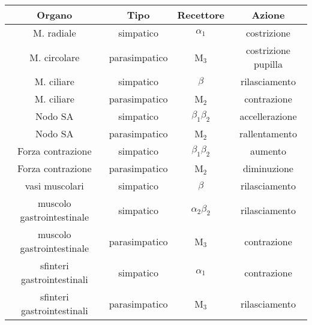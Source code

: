 
\begin{tabular}{|c|c|c|c|}
\hline 
\textbf{Organo} & \textbf{Tipo} & \textbf{Recettore} & \textbf{Azione} \\ 
\hline\hline 
M. radiale & simpatico & $\alpha_1$ & costrizione \\ 
\hline 
M. circolare & parasimpatico & M${}_3$ & costrizione pupilla \\ 
\hline 
M. ciliare & simpatico & $\beta$ & rilasciamento \\ 
\hline 
M. ciliare & parasimpatico & M${}_2$ & contrazione \\ 
\hline 
Nodo SA & simpatico & $\beta_1\beta_2$ & accellerazione \\ 
\hline 
Nodo SA & parasimpatico & M${}_2$ & rallentamento \\ 
\hline 
Forza contrazione & simpatico & $\beta_1\beta_2$ & aumento \\ 
\hline 
Forza contrazione & parasimpatico & M${}_2$ & diminuzione \\ 
\hline 
vasi muscolari & simpatico & $\beta$ & rilasciamento \\ 
\hline 
muscolo gastrointestinale & simpatico & $\alpha_2\beta_2$ & rilasciamento \\ 
\hline 
muscolo gastrointestinale & parasimpatico & M${}_3$ & contrazione \\ 
\hline 
sfinteri gastrointestinali & simpatico & $\alpha_1$ & contrazione \\ 
\hline 
sfinteri gastrointestinali & parasimpatico & M${}_3$ & rilasciamento \\ 
\hline 
\end{tabular} 

